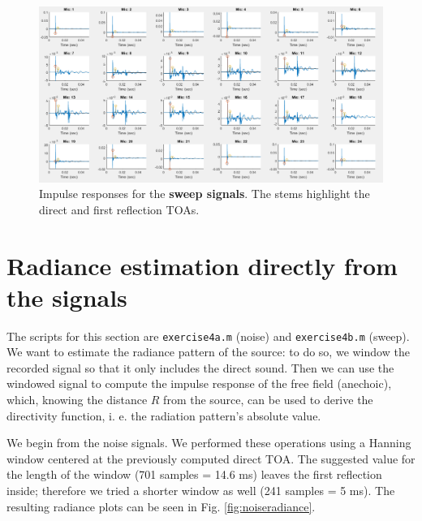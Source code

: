 \documentclass[a4paper]{article}
\begin{document}
\begin{figure}[h]
	\centering
	\includegraphics[width=0.85\linewidth]{sweep_ir.png}
	\caption{Impulse responses for the \textbf{sweep signals}. The stems highlight the direct and first reflection TOAs.}
	\label{fig:sweepir}
\end{figure}


\section{Radiance estimation directly from the signals}
The scripts for this section are \verb|exercise4a.m| (noise) and \verb|exercise4b.m| (sweep). We want to estimate the radiance pattern of the source: to do so, we window the recorded signal so that it only includes the direct sound. Then we can use the windowed signal to compute the impulse response of the free field (anechoic), which, knowing the distance $R$ from the source, can be used to derive the directivity function, i. e. the radiation pattern's absolute value.

We begin from the noise signals. We performed these operations using a Hanning window centered at the previously computed direct TOA. The suggested value for the length of the window (701 samples = 14.6 ms) leaves the first reflection inside; therefore we tried a shorter window as well (241 samples = 5 ms). The resulting radiance plots can be seen in Fig. \ref{fig:noiseradiance}.
\end{document}
